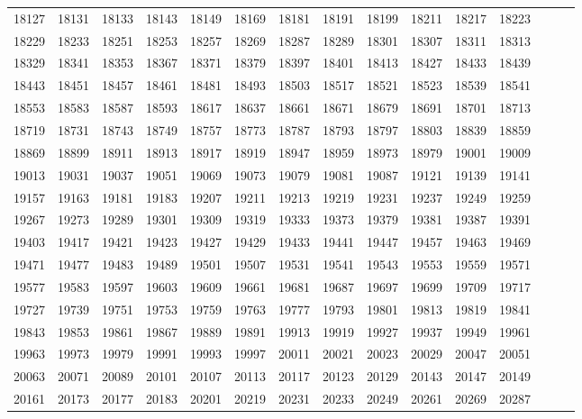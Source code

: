 \documentclass[10pt, a4paper]{article}
\begin{document}
\begin{center}
\begin{longtable}{c c c c c c c c c c c c c c c}
        18127 & 18131 & 18133 & 18143 & 18149 & 18169 & 18181 & 18191 & 18199 & 18211 & 18217 & 18223 \\
        18229 & 18233 & 18251 & 18253 & 18257 & 18269 & 18287 & 18289 & 18301 & 18307 & 18311 & 18313 \\
        18329 & 18341 & 18353 & 18367 & 18371 & 18379 & 18397 & 18401 & 18413 & 18427 & 18433 & 18439 \\
        18443 & 18451 & 18457 & 18461 & 18481 & 18493 & 18503 & 18517 & 18521 & 18523 & 18539 & 18541 \\
        18553 & 18583 & 18587 & 18593 & 18617 & 18637 & 18661 & 18671 & 18679 & 18691 & 18701 & 18713 \\
        18719 & 18731 & 18743 & 18749 & 18757 & 18773 & 18787 & 18793 & 18797 & 18803 & 18839 & 18859 \\
        18869 & 18899 & 18911 & 18913 & 18917 & 18919 & 18947 & 18959 & 18973 & 18979 & 19001 & 19009 \\
        19013 & 19031 & 19037 & 19051 & 19069 & 19073 & 19079 & 19081 & 19087 & 19121 & 19139 & 19141 \\
        19157 & 19163 & 19181 & 19183 & 19207 & 19211 & 19213 & 19219 & 19231 & 19237 & 19249 & 19259 \\
        19267 & 19273 & 19289 & 19301 & 19309 & 19319 & 19333 & 19373 & 19379 & 19381 & 19387 & 19391 \\
        19403 & 19417 & 19421 & 19423 & 19427 & 19429 & 19433 & 19441 & 19447 & 19457 & 19463 & 19469 \\
        19471 & 19477 & 19483 & 19489 & 19501 & 19507 & 19531 & 19541 & 19543 & 19553 & 19559 & 19571 \\
        19577 & 19583 & 19597 & 19603 & 19609 & 19661 & 19681 & 19687 & 19697 & 19699 & 19709 & 19717 \\
        19727 & 19739 & 19751 & 19753 & 19759 & 19763 & 19777 & 19793 & 19801 & 19813 & 19819 & 19841 \\
        19843 & 19853 & 19861 & 19867 & 19889 & 19891 & 19913 & 19919 & 19927 & 19937 & 19949 & 19961 \\
        19963 & 19973 & 19979 & 19991 & 19993 & 19997 & 20011 & 20021 & 20023 & 20029 & 20047 & 20051 \\
        20063 & 20071 & 20089 & 20101 & 20107 & 20113 & 20117 & 20123 & 20129 & 20143 & 20147 & 20149 \\
        20161 & 20173 & 20177 & 20183 & 20201 & 20219 & 20231 & 20233 & 20249 & 20261 & 20269 & 20287 \\

\end{longtable}
\end{center}
\end{document}
